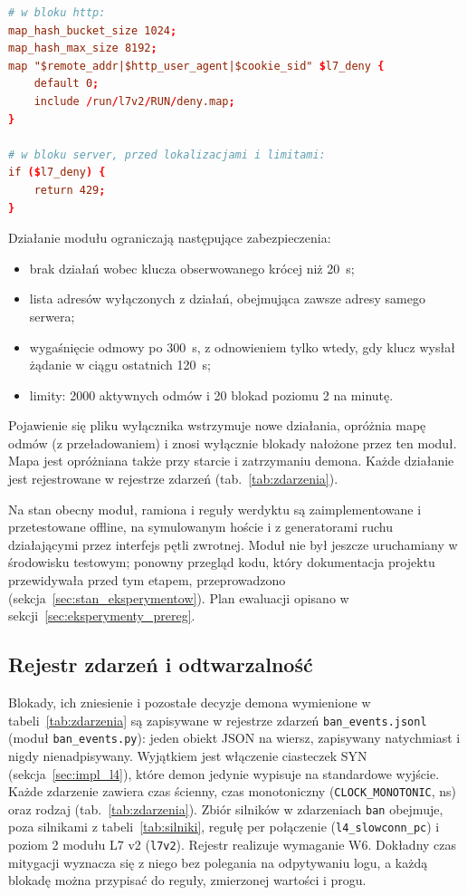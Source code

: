 \documentclass[a4paper,12pt]{article}
\begin{document}
\begin{lstlisting}[language=conf, caption={Mapa odmów dodawana do konfiguracji Nginx przez moduł L7 v2 (wynik funkcji \texttt{l7\_conf.protected} dla \texttt{nginx.conf}; katalog przebiegu oznaczono \texttt{RUN})}, label=lst:denymap]
# w bloku http:
map_hash_bucket_size 1024;
map_hash_max_size 8192;
map "$remote_addr|$http_user_agent|$cookie_sid" $l7_deny {
    default 0;
    include /run/l7v2/RUN/deny.map;
}

# w bloku server, przed lokalizacjami i limitami:
if ($l7_deny) {
    return 429;
}
\end{lstlisting}

Działanie modułu ograniczają następujące zabezpieczenia:
\begin{itemize}
    \item brak działań wobec klucza obserwowanego krócej niż 20~s;
    \item lista adresów wyłączonych z działań, obejmująca zawsze adresy samego serwera;
    \item wygaśnięcie odmowy po 300~s, z odnowieniem tylko wtedy, gdy klucz wysłał żądanie w ciągu ostatnich 120~s;
    \item limity: 2000 aktywnych odmów i 20 blokad poziomu 2 na minutę.
\end{itemize}
Pojawienie się pliku wyłącznika wstrzymuje nowe działania, opróżnia mapę odmów (z przeładowaniem) i znosi wyłącznie blokady nałożone przez ten moduł. Mapa jest opróżniana także przy starcie i zatrzymaniu demona. Każde działanie jest rejestrowane w rejestrze zdarzeń (tab.~\ref{tab:zdarzenia}).

Na stan obecny moduł, ramiona i reguły werdyktu są zaimplementowane i przetestowane offline, na symulowanym hoście i z generatorami ruchu działającymi przez interfejs pętli zwrotnej. Moduł nie był jeszcze uruchamiany w środowisku testowym; ponowny przegląd kodu, który dokumentacja projektu przewidywała przed tym etapem, przeprowadzono (sekcja~\ref{sec:stan_eksperymentow}). Plan ewaluacji opisano w sekcji~\ref{sec:eksperymenty_prereg}.

\subsection{Rejestr zdarzeń i odtwarzalność}\label{sec:impl_events}
Blokady, ich zniesienie i pozostałe decyzje demona wymienione w tabeli~\ref{tab:zdarzenia} są zapisywane w rejestrze zdarzeń \texttt{ban\_events.jsonl} (moduł \texttt{ban\_events.py}): jeden obiekt JSON na wiersz, zapisywany natychmiast i nigdy nienadpisywany. Wyjątkiem jest włączenie ciasteczek SYN (sekcja~\ref{sec:impl_l4}), które demon jedynie wypisuje na standardowe wyjście. Każde zdarzenie zawiera czas ścienny, czas monotoniczny (\texttt{CLOCK\_MONOTONIC}, ns) oraz rodzaj (tab.~\ref{tab:zdarzenia}). Zbiór silników w zdarzeniach \texttt{ban} obejmuje, poza silnikami z tabeli~\ref{tab:silniki}, regułę per połączenie (\texttt{l4\_slowconn\_pc}) i poziom 2 modułu L7 v2 (\texttt{l7v2}). Rejestr realizuje wymaganie W6. Dokładny czas mitygacji wyznacza się z niego bez polegania na odpytywaniu logu, a każdą blokadę można przypisać do reguły, zmierzonej wartości i progu.
\end{document}

